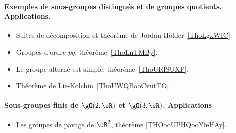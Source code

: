 \paragraph{Exemples de sous-groupes distingués et de groupes quotients. Applications.}
\begin{itemize}
    \item Suites de décomposition et théorème de Jordan-Hölder~\ref{ThoLgxWIC}.
    \item Groupes d'ordre \( pq\), théorème~\ref{ThoLnTMBy}.
    \item Le groupe alterné est simple, théorème~\ref{ThoURfSUXP}.
    \item Théorème de Lie-Kolchin~\ref{ThoUWQBooCvutTO}.
\end{itemize}
\paragraph{Sous-groupes finis de \( \gO(2,\eR)\) et \( \gO(3,\eR)\). Applications}
\begin{itemize}
    \item Les groupes de pavage de \( \eR^2\), théorème \ref{THOooUPHQooYfeHAy}.
\end{itemize}
